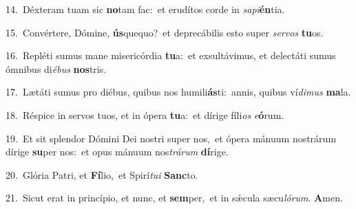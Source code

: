 {\numbfont\textcolor{\numbcolor}{14.}}~Déxteram tuam sic \textbf{no}\-tam fac:~\star et erudítos corde in \textit{sa}\-\textit{pi}\textbf{én}tia.\par
{\numbfont\textcolor{\numbcolor}{15.}}~Convértere, Dómine, \textbf{ús}\-quequo?~\star et deprecábilis esto super \textit{ser}\-\textit{vos} \textbf{tu}\-os.\par
{\numbfont\textcolor{\numbcolor}{16.}}~Repléti sumus mane misericórdia \textbf{tu}\-a:~\star et exsultávimus, et delectáti sumus ómnibus di\-\textit{é}\-\textit{bus} \textbf{nos}\-tris.\par
{\numbfont\textcolor{\numbcolor}{17.}}~Lætáti sumus pro diébus, quibus nos humili\-\textbf{ás}\-ti:~\star annis, quibus ví\-\textit{di}\-\textit{mus} \textbf{ma}\-la.\par
{\numbfont\textcolor{\numbcolor}{18.}}~Réspice in servos tuos, et in ópera \textbf{tu}\-a:~\star et dírige fíli\textit{os} \textit{e}\-\textbf{ó}rum.\par
{\numbfont\textcolor{\numbcolor}{19.}}~Et sit splendor Dómini Dei nostri super nos,~\dagger et ópera mánuum nostrárum dírige \textbf{su}\-per nos:~\star et opus mánuum nos\-\textit{trá}\-\textit{rum} \textbf{dí}\-rige.\par
{\numbfont\textcolor{\numbcolor}{20.}}~Glória Patri, et \textbf{Fí}\-lio,~\star et Spirí\-\textit{tu}\-\textit{i} \textbf{Sanc}\-to.\par
{\numbfont\textcolor{\numbcolor}{21.}}~Sicut erat in princípio, et nunc, et \textbf{sem}\-per,~\star et in sǽcula sæcu\-\textit{ló}\-\textit{rum}. \textbf{A}\-men.\par
